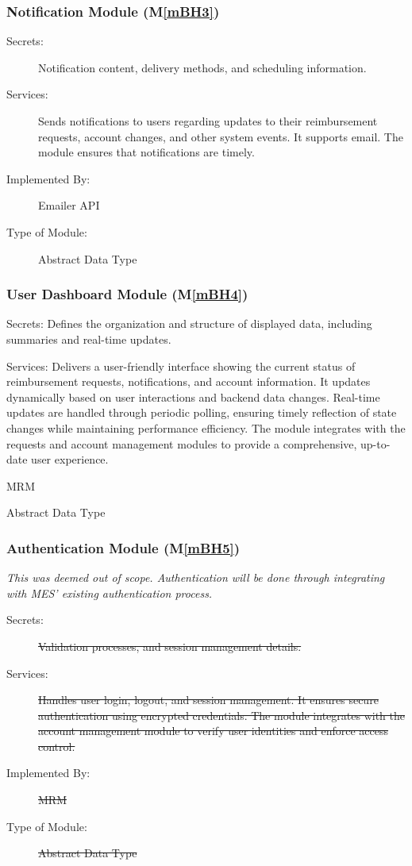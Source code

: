 \documentclass[12pt, titlepage]{article}
\newcommand{\mref}[1]{M\ref{#1}}
\begin{document}
\subsubsection{Notification Module (\mref{mBH3})}

\begin{description}
\item[Secrets:] Notification content, delivery methods, and scheduling information.
\item[Services:] Sends notifications to users regarding updates to their reimbursement requests, account changes, and other system events. It supports email. The module ensures that notifications are timely.
\item[Implemented By:] Emailer API
\item[Type of Module:] Abstract Data Type
\end{description}

\subsubsection{User Dashboard Module (\mref{mBH4})}

\begin{description}
\item{Secrets:} Defines the organization and structure of displayed data, including summaries and real-time updates.

\item{Services:} Delivers a user-friendly interface showing the current status of reimbursement requests, notifications, and account information. It updates dynamically based on user interactions and backend data changes. Real-time updates are handled through periodic polling, ensuring timely reflection of state changes while maintaining performance efficiency. The module integrates with the requests and account management modules to provide a comprehensive, up-to-date user experience.

\item[Implemented By:] MRM
\item[Type of Module:] Abstract Data Type
\end{description}

\subsubsection{Authentication Module (\mref{mBH5})}
\textit{This was deemed out of scope. Authentication will be done through integrating with MES' existing authentication process.}
\begin{description}
\item[Secrets:] \st{Validation processes, and session management details.}
\item[Services:] \st{Handles user login, logout, and session management. It ensures secure authentication using encrypted credentials. The module integrates with the account management module to verify user identities and enforce access control.}


\item[Implemented By:] \st{MRM}
\item[Type of Module:] \st{Abstract Data Type} 
\end{description}
\end{document}
